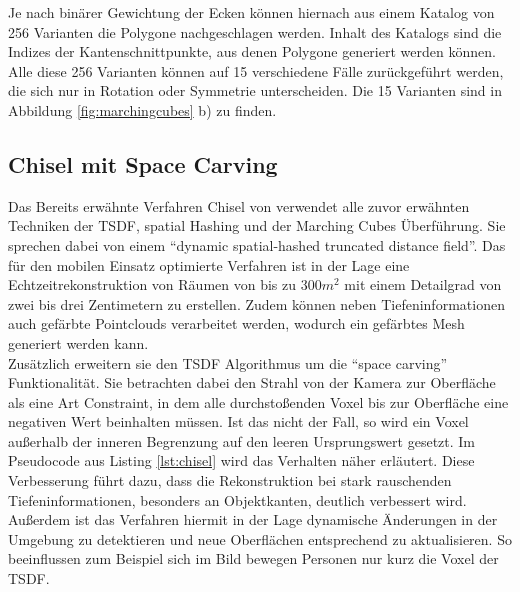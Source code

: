 Je nach binärer Gewichtung der Ecken können hiernach aus einem Katalog von 256 Varianten die Polygone nachgeschlagen werden. Inhalt des Katalogs sind die Indizes der Kantenschnittpunkte, aus denen Polygone generiert werden können. Alle diese 256 Varianten können auf 15 verschiedene Fälle zurückgeführt werden, die sich nur in Rotation oder Symmetrie unterscheiden. Die 15 Varianten sind in Abbildung \ref{fig:marchingcubes} b) zu finden. \citep{MarchingCubes:online} \\

\subsection{Chisel mit Space Carving}

Das Bereits erwähnte Verfahren Chisel von \citet{Klingensmith_2015_7924} verwendet alle zuvor erwähnten Techniken der TSDF, spatial Hashing und der Marching Cubes Überführung. Sie sprechen dabei von einem \enquote{dynamic spatial-hashed truncated distance field}. Das für den mobilen Einsatz optimierte Verfahren ist in der Lage eine Echtzeitrekonstruktion von Räumen von bis zu \(300 m^2\) mit einem Detailgrad von zwei bis drei Zentimetern zu erstellen. Zudem können neben Tiefeninformationen auch gefärbte Pointclouds verarbeitet werden, wodurch ein gefärbtes Mesh generiert werden kann. \citep{Klingensmith_2015_7924}\\

Zusätzlich erweitern sie den TSDF Algorithmus um die \enquote{space carving} Funktionalität. Sie betrachten dabei den Strahl von der Kamera zur Oberfläche als eine Art Constraint, in dem alle durchstoßenden Voxel bis zur Oberfläche eine negativen Wert beinhalten müssen. Ist das nicht der Fall, so wird ein Voxel außerhalb der inneren Begrenzung auf den leeren Ursprungswert gesetzt. Im Pseudocode aus Listing \ref{lst:chisel} wird das Verhalten näher erläutert. Diese Verbesserung führt dazu, dass die Rekonstruktion bei stark rauschenden Tiefeninformationen, besonders an Objektkanten, deutlich verbessert wird. Außerdem ist das Verfahren hiermit in der Lage dynamische Änderungen in der Umgebung zu detektieren und neue Oberflächen entsprechend zu aktualisieren. So beeinflussen zum Beispiel sich im Bild bewegen Personen nur kurz die Voxel der TSDF. \citep{Klingensmith_2015_7924}\\

